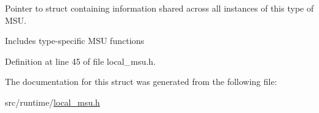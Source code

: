 Pointer to struct containing information shared across all instances of this type of M\-S\-U. 

Includes type-\/specific M\-S\-U functions 

Definition at line 45 of file local\-\_\-msu.\-h.



The documentation for this struct was generated from the following file\-:\begin{DoxyCompactItemize}
\item 
src/runtime/\hyperlink{local__msu_8h}{local\-\_\-msu.\-h}\end{DoxyCompactItemize}
